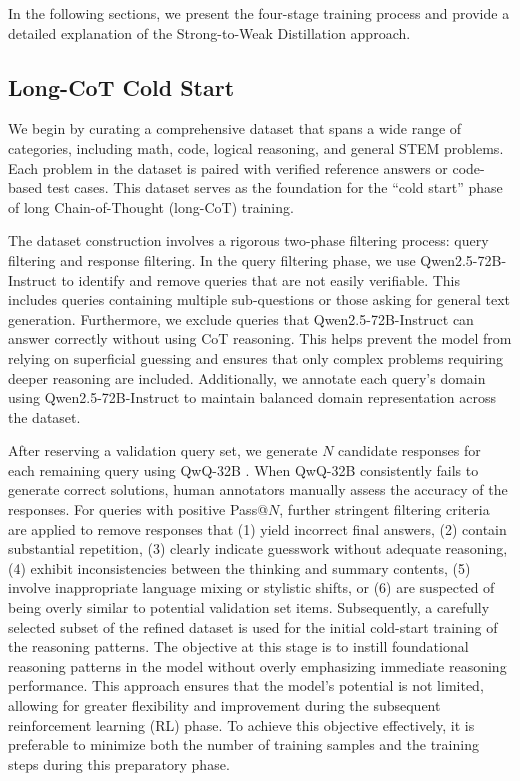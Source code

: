 In the following sections, we present the four-stage training process and provide a detailed explanation of the Strong-to-Weak Distillation approach.




\subsection{Long-CoT Cold Start}

We begin by curating a comprehensive dataset that spans a wide range of categories, including math, code, logical reasoning, and general STEM problems. Each problem in the dataset is paired with verified reference answers or code-based test cases. This dataset serves as the foundation for the ``cold start'' phase of long Chain-of-Thought (long-CoT) training.

The dataset construction involves a rigorous two-phase filtering process: query filtering and response filtering.
In the query filtering phase, we use Qwen2.5-72B-Instruct to identify and remove queries that are not easily verifiable. This includes queries containing multiple sub-questions or those asking for general text generation. 
Furthermore, we exclude queries that Qwen2.5-72B-Instruct can answer correctly without using CoT reasoning. This helps prevent the model from relying on superficial guessing and ensures that only complex problems requiring deeper reasoning are included.
Additionally, we annotate each query's domain using Qwen2.5-72B-Instruct to maintain balanced domain representation across the dataset.

After reserving a validation query set, we generate $N$ candidate responses for each remaining query using QwQ-32B \citep{qwq32b}. 
When QwQ-32B consistently fails to generate correct solutions, human annotators manually assess the accuracy of the responses.
For queries with positive Pass@$N$, further stringent filtering criteria are applied to remove responses that (1) yield incorrect final answers, (2) contain substantial repetition, (3) clearly indicate guesswork without adequate reasoning, (4) exhibit inconsistencies between the thinking and summary contents, (5) involve inappropriate language mixing or stylistic shifts, or (6) are suspected of being overly similar to potential validation set items.
Subsequently, a carefully selected subset of the refined dataset is used for the initial cold-start training of the reasoning patterns. 
The objective at this stage is to instill foundational reasoning patterns in the model without overly emphasizing immediate reasoning performance. 
This approach ensures that the model's potential is not limited, allowing for greater flexibility and improvement during the subsequent reinforcement learning (RL) phase. 
To achieve this objective effectively, it is preferable to minimize both the number of training samples and the training steps during this preparatory phase.




